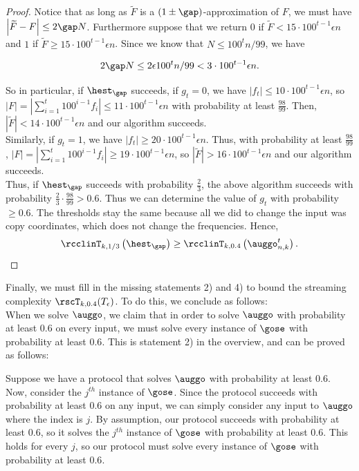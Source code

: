\begin{proof}
	Notice that as long as $\widetilde{F}$ is a $(1\pm \gap)$-approximation of $F$, we must have $\left| \widetilde{F} -  F \right| \le 2\gap N$. Furthermore suppose that we return $0$ if $\widetilde{F} < 15 \cdot 100^{t-1}\epsilon n$ and $1$ if $\widetilde{F} \ge 15 \cdot 100^{t-1}\epsilon n$. Since we know that $N \le 100^{t}n/99$, we have
	
	$$2 \gap N \le 2 \epsilon 100^{t}n/99 < 3 \cdot 100^{t-1} \epsilon n.$$
	
	So in particular, if $\hest_\gap$ succeeds, if $g_t = 0$, we have $|f_t| \le 10 \cdot 100^{t-1}\epsilon n$, so $|F| = |\sum_{i=1}^{t}100^{i-1}f_i| \le 11 \cdot 100^{t-1} \epsilon n$ with probability at least $\frac{98}{99}$. Then, $|\tilde{F}| < 14 \cdot 100^{t-1} \epsilon n$ and our algorithm succeeds.\\
	
	Similarly, if $g_t = 1$, we have $|f_t| \ge 20 \cdot 100^{t-1} \epsilon n$. Thus, with probability at least $\frac{98}{99}$, $|F| = |\sum_{i=1}^{t}100^{i-1}f_i| \ge 19 \cdot 100^{t-1} \epsilon n$, so $|\tilde{F}| > 16 \cdot 100^{t-1} \epsilon n$ and our algorithm succeeds.\\
	
	Thus, if $\hest_\gap$ succeeds with probability $\frac{2}{3}$, the above algorithm succeeds with probability $\frac{2}{3} \cdot \frac{98}{99} > 0.6$. Thus we can determine the value of $g_t$ with probability $\ge 0.6$. The thresholds stay the same because all we did to change the input was copy coordinates, which does not change the frequencies. Hence,
	\begin{align}\notag
		\rcclinT_{k,1/3}\left(\hest_\gap \right) 
		\ge \rcclinT_{k,0.4}\left( \auggo_{n,k}^{t} \right).
	\end{align}
\end{proof}	

{\color{black} Finally, we must fill in the missing statements 2) and 4)} to bound the streaming complexity $\rscT_{k,0.4}( T_\epsilon)$. To do this, we conclude as follows:\\
	
	When we solve $\auggo$, we claim that in order to solve $\auggo$ with probability at least $0.6$ on every input, we must solve every instance of $\gose$ with probability at least $0.6$. {\color{black} This is statement 2) in the overview, and can be proved as follows:}
	
	{\color{black}Suppose we have a protocol that solves $\auggo$ with probability at least $0.6$. Now, consider the $j^{th}$ instance of $\gose$. Since the protocol succeeds with probability at least $0.6$ on any input, we can simply consider any input to $\auggo$ where the index is $j$. By assumption, our protocol succeeds with probability at least $0.6$, so it solves the $j^{th}$ instance of $\gose$ with probability at least $0.6$. This holds for every $j$, so our protocol must solve every instance of $\gose$ with probability at least $0.6$.}
	
